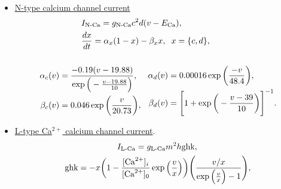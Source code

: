 \documentclass[../main.tex]{subfiles}
\begin{document}
\begin{itemize}
\begin{equation}
\begin{aligned}
           \label{eq:cck-calcium-current-2}
        \end{aligned}
        \end{equation}
        \clearpage
        \item     \underline{N-type calcium channel current} 
        \begin{equation}
        \begin{aligned}
            &\hspace{-2.8cm}I_{\text{N-Ca}} = g_{\text{N-Ca}}c^2d(v-E_{\text{Ca}}),\\ 
            &\hspace{-2.8cm}\displaystyle\frac{dx}{dt} = \alpha_x(1-x)-\beta_xx, \hspace{0.2cm} x = \{ c,d\},\\
        & \\
        \begin{aligned}
            \alpha_c(v) &= \displaystyle\frac{-0.19(v-19.88)}{\exp{\Big(-\frac{v-19.88}{10} \Big)}},\\ %
            \beta_c(v)  &= 0.046\exp{\bigg(\displaystyle\frac{v}{20.73} \bigg)},\hspace{3mm}\\
        \end{aligned}
        &
        \begin{aligned}
            \alpha_d(v) &= 0.00016\exp{\bigg( \displaystyle\frac{-v}{48.4}\bigg)},\\ %
            \beta_d(v)  &= \Bigg[ 1+\exp{\bigg(-\displaystyle\frac{v-39}{10} \bigg)}\Bigg]^{-1}.\\
        \end{aligned}
        \end{aligned}
        \label{eq:cck-N-current}
        \end{equation}
    \item \underline{L-type Ca$^{2+}$ calcium channel current}.
        \begin{equation}
        \begin{aligned}
        \begin{split}
            &\hspace{2.2cm}I_{\text{L-Ca}} = g_{\text{L-Ca}}m^2h\text{ghk},\\
            &\text{ghk} = -x\bigg(1-\displaystyle\frac{[\text{Ca}^{2+}]_i}{[\text{Ca}^{2+}]_0}\exp{\Big( \frac{v}{x}\Big)} \bigg)\Bigg(
            \displaystyle\frac{v/x}{\exp{\Big(\frac{v}{x} \Big)}-1}\Bigg),\\

\end{split}
\end{aligned}
\end{equation}
\end{itemize}
\end{document}
